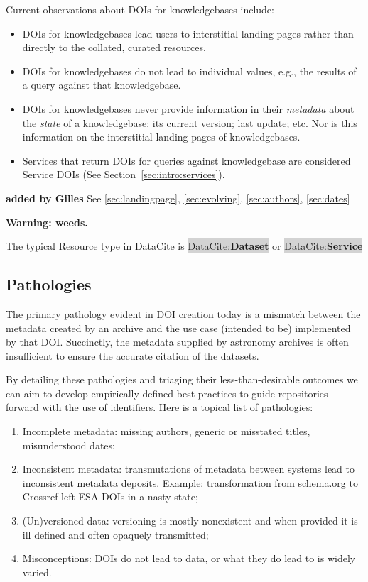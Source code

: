 \documentclass[11pt,a4paper]{ivoa}
\newcommand{\dataciteterm}[1]{\colorbox{lightgray}{DataCite:\textbf{#1}}}
\begin{document}
Current observations about DOIs for knowledgebases include:


\begin{itemize}
	\item DOIs for knowledgebases lead users to interstitial landing pages rather than directly to the collated, curated resources. 
	\item DOIs for knowledgebases do not lead to individual values, e.g., the results of a query against that knowledgebase.
	\item DOIs for knowledgebases never provide information in their \textit{metadata} about the \textit{state} of a knowledgebase: its current version; last update; etc. 
	Nor is this information on the interstitial landing pages of knowledgebases.
	\item Services that return DOIs for queries against knowledgebase are considered Service DOIs (See Section~\ref{sec:intro:services}).
\end{itemize}

\textbf{\color{red} added by Gilles}
See \ref{sec:landingpage}, \ref{sec:evolving}, \ref{sec:authors}, \ref{sec:dates}

\textbf{Warning: weeds.}

The typical Resource type in DataCite is \dataciteterm{Dataset} or \dataciteterm{Service}

\subsection{Pathologies}
\label{sec:use:patho}

The primary pathology evident in DOI creation today is a mismatch between the metadata created by an archive and the use case (intended to be) implemented by that DOI. 
Succinctly, the metadata supplied by astronomy archives is often insufficient to ensure the accurate citation of the datasets.

By detailing these pathologies and triaging their less-than-desirable outcomes we can aim to develop empirically-defined best practices to guide repositories forward with the use of identifiers.
Here is a topical list of pathologies:

\begin{enumerate}
	\item Incomplete metadata: missing authors, generic or misstated titles, misunderstood dates;
	\item Inconsistent metadata: transmutations of metadata between systems lead to inconsistent metadata deposits. Example: transformation from schema.org to Crossref left ESA DOIs in a nasty state;
	\item (Un)versioned data: versioning is mostly nonexistent and when provided it is ill defined and often opaquely transmitted;
	\item Misconceptions: DOIs do not lead to data, or what they do lead to is widely varied.
\end{enumerate}
\end{document}

